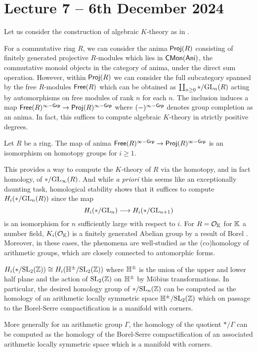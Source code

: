 \section{Lecture 7 -- 6th December 2024}\label{sec: lecture 7}
Let us consider the construction of algebraic $K$-theory as in . 

For a commutative ring $R$, we can consider the anima $\mathsf{Proj}(R)$ consisting of finitely generated projective $R$-modules which lies in $\mathsf{CMon}(\mathsf{Ani})$, the commutative monoid objects in the category of anima, under the direct sum operation. However, within $\mathsf{Proj}(R)$ we can consider the full subcategory spanned by the free $R$-modules $\mathsf{Free}(R)$ which can be obtained as $\coprod_{n\geq0}*/\mathrm{GL}_{n}(R)$ acting by automorphisms on free modules of rank $n$ for each $n$. The inclusion induces a map $\mathsf{Free}(R)^{\infty-\mathsf{Grp}}\to\mathsf{Proj}(R)^{\infty-\mathsf{Grp}}$ where $(-)^{\infty-\mathsf{Grp}}$ denotes group completion as an anima. In fact, this suffices to compute algebraic $K$-theory in strictly positive degrees. 
\begin{proposition}\label{prop: K-theory on free modules}
    Let $R$ be a ring. The map of anima $\mathsf{Free}(R)^{\infty-\mathsf{Grp}}\to\mathsf{Proj}(R)^{\infty-\mathsf{Grp}}$ is an isomorphism on homotopy groups for $i\geq 1$. 
\end{proposition}
This provides a way to compute the $K$-theory of $R$ via the homotopy, and in fact homology, of $*/\mathrm{GL}_{\infty}(R)$. And while \emph{a priori} this seems like an exceptionally daunting task, homological stability shows that it suffices to compute $H_{i}(*/\mathrm{GL}_{n}(R))$ since the map 
$$H_{i}(*/\mathrm{GL}_{n})\longrightarrow H_{i}(*/\mathrm{GL}_{n+1})$$
is an isomorphism for $n$ sufficiently large with respect to $i$. For $R=\mathcal{O}_{\mathbb{K}}$ for $\mathbb{K}$ a number field, $K_{i}(\mathcal{O}_{\mathbb{K}})$ is a finitely generated Abelian group by a result of Borel . Moreover, in these cases, the phenomena are well-studied as the (co)homology of arithmetic groups, which are closely connected to automorphic forms. 
\begin{example}
    $H_{i}(*/\mathrm{SL}_{2}(\mathbb{Z}))\cong H_{i}(\mathbb{H}^{\pm}/\mathrm{SL}_{2}(\mathbb{Z}))$ where $\mathbb{H}^{\pm}$ is the union of the upper and lower half plane and the action of $\mathrm{SL}_{2}(\mathbb{Z})$ on $\mathbb{H}^{\pm}$ by M\"{o}bius transformations. In particular, the desired homology group of $*/\mathrm{SL}_{n}(\mathbb{Z})$ can be computed as the homology of an arithmetic locally symmetric space $\mathbb{H}^{\pm}/\mathrm{SL}_{2}(\mathbb{Z})$ which on passage to the Borel-Serre compactification is a manifold with corners. 

    More generally for an arithmetic group $\Gamma$, the homology of the quotient $*/\Gamma$ can be computed as the homology of the Borel-Serre compactification of an associated arithmetic locally symmetric space which is a manifold with corners. 
\end{example}
